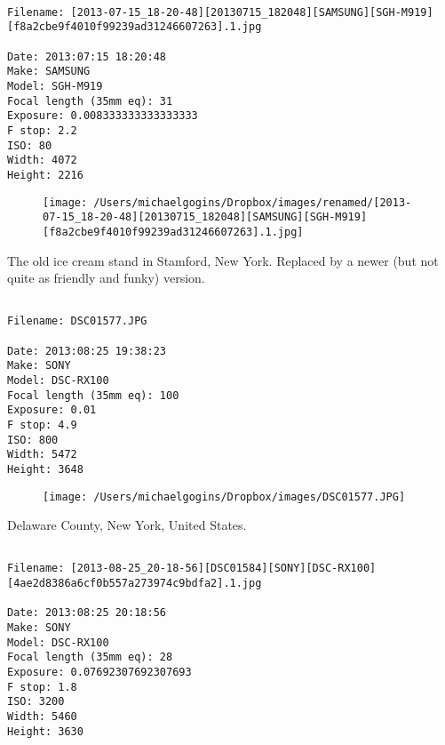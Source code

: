 \documentclass[11pt,letter,DIV=14,paper=landscape]{scrbook}
\begin{document}
\clearpage
\noindent 
\noindent
\begin{lstlisting}

Filename: [2013-07-15_18-20-48][20130715_182048][SAMSUNG][SGH-M919][f8a2cbe9f4010f99239ad31246607263].1.jpg

Date: 2013:07:15 18:20:48
Make: SAMSUNG
Model: SGH-M919
Focal length (35mm eq): 31
Exposure: 0.008333333333333333
F stop: 2.2
ISO: 80
Width: 4072
Height: 2216
\end{lstlisting}
\clearpage

\begin{figure}
\texttt{[image: /Users/michaelgogins/Dropbox/images/renamed/[2013-07-15\_18-20-48][20130715\_182048][SAMSUNG][SGH-M919][f8a2cbe9f4010f99239ad31246607263].1.jpg]}
\end{figure}
    
\clearpage
\noindent The old ice cream stand in Stamford, New York. Replaced by a newer (but not quite as friendly and funky) version.
\noindent
\begin{lstlisting}

Filename: DSC01577.JPG

Date: 2013:08:25 19:38:23
Make: SONY
Model: DSC-RX100
Focal length (35mm eq): 100
Exposure: 0.01
F stop: 4.9
ISO: 800
Width: 5472
Height: 3648
\end{lstlisting}
\clearpage

\begin{figure}
\texttt{[image: /Users/michaelgogins/Dropbox/images/DSC01577.JPG]}
\end{figure}
    
\clearpage
\noindent Delaware County, New York, United States.
\noindent
\begin{lstlisting}

Filename: [2013-08-25_20-18-56][DSC01584][SONY][DSC-RX100][4ae2d8386a6cf0b557a273974c9bdfa2].1.jpg

Date: 2013:08:25 20:18:56
Make: SONY
Model: DSC-RX100
Focal length (35mm eq): 28
Exposure: 0.07692307692307693
F stop: 1.8
ISO: 3200
Width: 5460
Height: 3630
\end{lstlisting}
\clearpage
\end{document}
